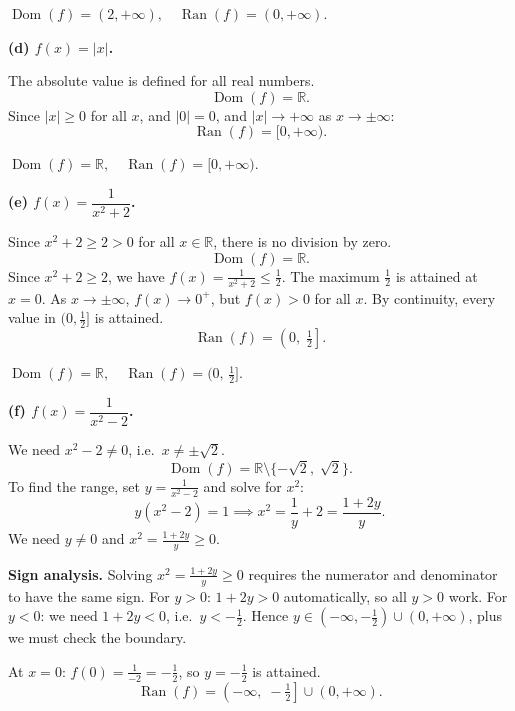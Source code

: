 \documentclass[12pt, a4paper]{article}
\newcommand{\R}{\mathbb{R}}
\begin{document}
\begin{answerbox}
$\operatorname{Dom}(f) = (2, +\infty), \quad \operatorname{Ran}(f) = (0, +\infty).$
\end{answerbox}

\bigskip
\textbf{(d)\; $f(x) = |x|$.}

The absolute value is defined for all real numbers.
\[
  \operatorname{Dom}(f) = \R.
\]
Since $|x| \ge 0$ for all $x$, and $|0| = 0$, and $|x| \to +\infty$ as $x \to \pm\infty$:
\[
  \operatorname{Ran}(f) = [0, +\infty).
\]

\begin{answerbox}
$\operatorname{Dom}(f) = \R, \quad \operatorname{Ran}(f) = [0, +\infty).$
\end{answerbox}

\bigskip
\textbf{(e)\; $f(x) = \dfrac{1}{x^2+2}$.}

Since $x^2 + 2 \ge 2 > 0$ for all $x \in \R$, there is no division by zero.
\[
  \operatorname{Dom}(f) = \R.
\]
Since $x^2 + 2 \ge 2$, we have $f(x) = \frac{1}{x^2+2} \le \frac{1}{2}$.
The maximum $\frac{1}{2}$ is attained at $x = 0$.
As $x \to \pm\infty$, $f(x) \to 0^+$, but $f(x) > 0$ for all $x$.
By continuity, every value in $(0, \frac{1}{2}]$ is attained.
\[
  \operatorname{Ran}(f) = \left(0,\; \tfrac{1}{2}\right].
\]

\begin{answerbox}
$\operatorname{Dom}(f) = \R, \quad \operatorname{Ran}(f) = \bigl(0,\, \frac{1}{2}\bigr].$
\end{answerbox}

\bigskip
\textbf{(f)\; $f(x) = \dfrac{1}{x^2-2}$.}

We need $x^2 - 2 \neq 0$, i.e.\ $x \neq \pm\sqrt{2}$.
\[
  \operatorname{Dom}(f) = \R \setminus \{-\sqrt{2},\; \sqrt{2}\}.
\]
To find the range, set $y = \frac{1}{x^2 - 2}$ and solve for $x^2$:
\[
  y(x^2 - 2) = 1 \implies x^2 = \frac{1}{y} + 2 = \frac{1 + 2y}{y}.
\]
We need $y \neq 0$ and $x^2 = \frac{1+2y}{y} \ge 0$.

\textbf{Sign analysis.}\; Solving $x^2 = \frac{1+2y}{y} \ge 0$ requires the numerator and denominator to have the same sign. For $y > 0$: $1+2y > 0$ automatically, so all $y > 0$ work. For $y < 0$: we need $1+2y < 0$, i.e.\ $y < -\tfrac{1}{2}$. Hence $y \in (-\infty, -\tfrac{1}{2}) \cup (0, +\infty)$, plus we must check the boundary.

At $x = 0$: $f(0) = \frac{1}{-2} = -\frac{1}{2}$, so $y = -\frac{1}{2}$ is attained.
\[
  \operatorname{Ran}(f) = \left(-\infty,\; -\tfrac{1}{2}\right] \cup (0, +\infty).
\]
\end{document}
